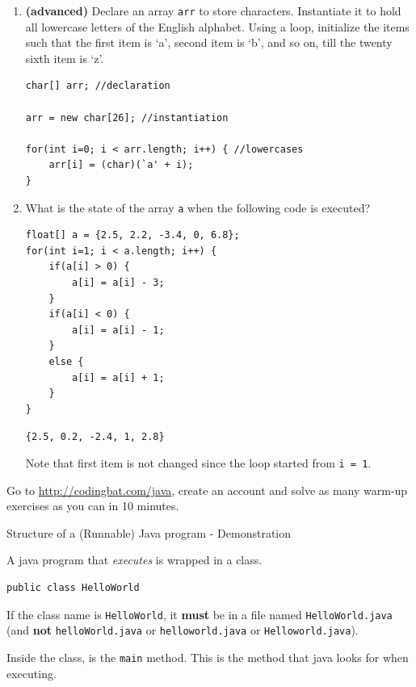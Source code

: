 \begin{questions}
\begin{enumerate}
\item \textbf{(advanced)} Declare an array \texttt{arr} to store characters. Instantiate it to hold all lowercase letters of the English alphabet. Using a loop, initialize the items such that the first item is `a', second item is `b', and so on, till the twenty sixth item is `z'.

\begin{solution}
\begin{lstlisting}
char[] arr; //declaration

arr = new char[26]; //instantiation

for(int i=0; i < arr.length; i++) { //lowercases
	arr[i] = (char)(`a' + i);
}
\end{lstlisting}
\end{solution}

\item What is the state of the array \texttt{a} when the following code is executed?

\begin{lstlisting}
float[] a = {2.5, 2.2, -3.4, 0, 6.8};
for(int i=1; i < a.length; i++) {
	if(a[i] > 0) {
		a[i] = a[i] - 3;
	}	
	if(a[i] < 0) {
		a[i] = a[i] - 1;
	}
	else {
		a[i] = a[i] + 1;
	}
}
\end{lstlisting}
\begin{solution}
\texttt{\{2.5, 0.2, -2.4, 1, 2.8\}}

Note that first item is not changed since the loop started from \texttt{i = 1}.	
\end{solution}
\end{enumerate}

\question Go to \url{http://codingbat.com/java}, create an account and solve as many warm-up exercises as you can in 10 minutes.

\vskip 1cm

\question Structure of a (Runnable) Java program - Demonstration

A java program that \emph{executes} is wrapped in a class.

\begin{verbatim}
public class HelloWorld	
\end{verbatim}

If the class name is \texttt{HelloWorld}, it \textbf{must} be in a file named \texttt{HelloWorld.java} (and \textbf{not} \texttt{helloWorld.java} or \texttt{helloworld.java} or \texttt{Helloworld.java}).

Inside the class, is the \texttt{main} method. This is the method that java looks for when executing.


\end{questions}
